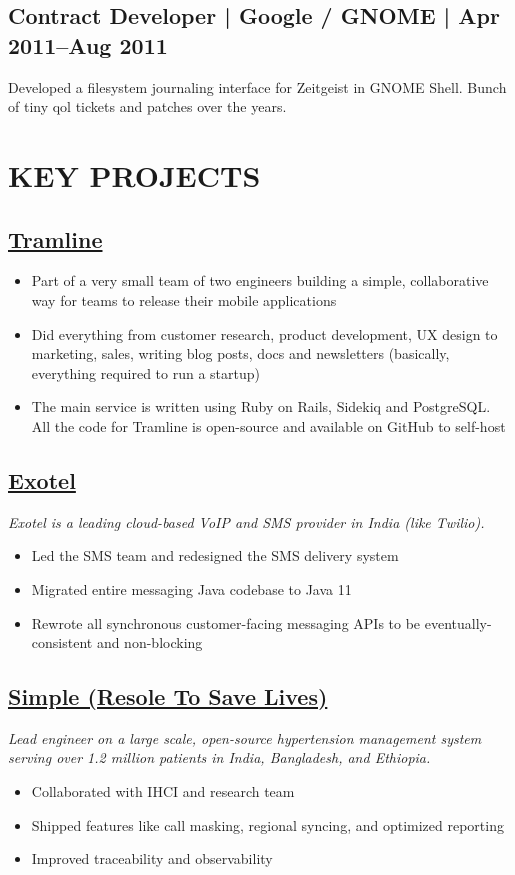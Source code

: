 \documentclass[11pt,a4paper]{article}
\begin{document}
\subsection*{Contract Developer | Google / GNOME | Apr 2011--Aug 2011}
Developed a filesystem journaling interface for Zeitgeist in GNOME Shell. Bunch of tiny qol tickets and patches over the years.

\section*{KEY PROJECTS}

\subsection*{\href{https://github.com/tramlinehq/tramline}{Tramline}}
\begin{itemize}
    \item Part of a very small team of two engineers building a simple, collaborative way for teams to release their mobile applications
    \item Did everything from customer research, product development, UX design to marketing, sales, writing blog posts, docs and newsletters (basically, everything required to run a startup)
    \item The main service is written using Ruby on Rails, Sidekiq and PostgreSQL. All the code for Tramline is open-source and available on GitHub to self-host
\end{itemize}

\subsection*{\href{https://exotel.com}{Exotel}}
\textit{Exotel is a leading cloud-based VoIP and SMS provider in India (like Twilio).}
\begin{itemize}
    \item Led the SMS team and redesigned the SMS delivery system
    \item Migrated entire messaging Java codebase to Java 11
    \item Rewrote all synchronous customer-facing messaging APIs to be eventually-consistent and non-blocking
\end{itemize}

\subsection*{\href{https://simple.org}{Simple (Resole To Save Lives)}}
\textit{Lead engineer on a large scale, open-source hypertension management system serving over 1.2 million patients in India, Bangladesh, and Ethiopia.}
\begin{itemize}
    \item Collaborated with IHCI and research team
    \item Shipped features like call masking, regional syncing, and optimized reporting
    \item Improved traceability and observability
\end{itemize}
\end{document}
